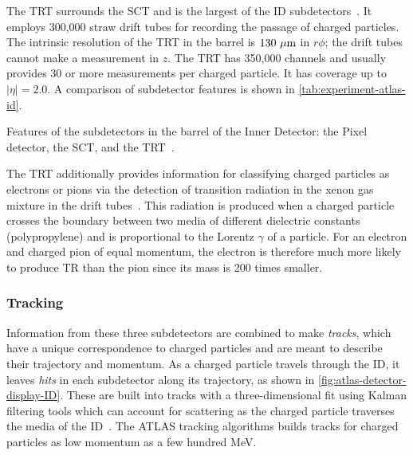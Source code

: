 The TRT surrounds the SCT and is the largest of the ID subdetectors~\cite{cern-jinst-atlas}. It employs 300,000 straw drift tubes for recording the passage of charged particles. The intrinsic resolution of the TRT in the barrel is $130\ \micron$ in $r\phi$; the drift tubes cannot make a measurement in $z$. The TRT has 350,000 channels and usually provides 30 or more measurements per charged particle. It has coverage up to $|\eta|=2.0$. A comparison of subdetector features is shown in \cref{tab:experiment-atlas-id}.

\begin{table}[bp]
  \centering
  \renewcommand{\arraystretch}{1.2}
  \caption{Features of the subdetectors in the barrel of the Inner Detector: the Pixel detector, the SCT, and the TRT~\cite{ATLAS-CONF-2014-047}.}
  
  \label{tab:experiment-atlas-id}
\end{table}

The TRT additionally provides information for classifying charged particles as electrons or pions via the detection of transition radiation in the xenon gas mixture in the drift tubes~\cite{ATLAS-CONF-2011-128}. This radiation is produced when a charged particle crosses the boundary between two media of different dielectric constants (polypropylene) and is proportional to the Lorentz $\gamma$ of a particle. For an electron and charged pion of equal momentum, the electron is therefore much more likely to produce TR than the pion since its mass is 200 times smaller.

\subsubsection{Tracking}

Information from these three subdetectors are combined to make \textit{tracks}, which have a unique correspondence to charged particles and are meant to describe their trajectory and momentum. As a charged particle travels through the ID, it leaves \textit{hits} in each subdetector along its trajectory, as shown in \cref{fig:atlas-detector-display-ID}. These are built into tracks with a three-dimensional fit using Kalman filtering tools which can account for scattering as the charged particle traverses the media of the ID~\cite{ATLAS-CONF-2014-047,ATLAS-CONF-2012-042}. The ATLAS tracking algorithms builds tracks for charged particles as low momentum as a few hundred MeV.

